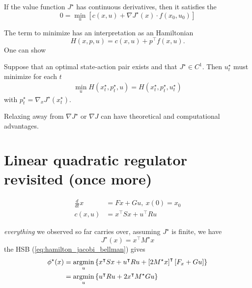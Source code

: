 \begin{theorem}\label{thm:1.23}
    If the value function \(J^\star\) has continuous derivatives, then it 
    satisfies the 
    \begin{equation}\label{eq:hamilton_jacobi_bellman}
        0=\min_{u}\left[c(x,u)+\nabla J^\star(x)\cdot f(x_0,u_0)\right]
    \end{equation}
\end{theorem}

The term to minimize  has an interpretation 
as an Hamiltonian 
\[H(x,p,u)=c(x,u)+p^\intercal f(x,u).\]
One can show 
\begin{theorem}\label{thm:1.24}
    Suppose that an optimal state-action pair exists 
    and that \(J^\star\in C^1\). Then \(u_t^\star\) must minimize
    for each \(t\) 
    \begin{align*}
        \min_u H(x_t^\star,p_t^\star,u)=H(x_t^\star,p_t^\star,u_t^\star)
    \end{align*}
    with \(p_t^\star=\nabla_x J^\star(x_t^\star)\).
\end{theorem}
\begin{remark}
    Relaxing away from \(\nabla J^\star\) or \(\nabla J\) can have 
    theoretical and computational advantages.
\end{remark}

\section{Linear quadratic regulator revisited (once more)}

\begin{align*}
    \frac{d}{dt}x&=Fx+Gu,\ x(0)=x_0\\
    c(x,u)&=x^\intercal S x + u^\intercal R u 
\end{align*}

\textit{everything} we observed so far carries over, assuming \(J^\star\) is finite, we 
have 
\[J^\star(x)=x^\intercal M^\star x\]
the HSB (\ref{eq:hamilton_jacobi_bellman}) gives 
\begin{align*}
    \phi^\star(x)&=\operatorname*{\text{argmin}}_u \left\{x^\intercal S x+ u^\intercal R u+ \left[2 M^\star x\right]^\intercal \left[F_x+ Gu\right] \right\}\\
    &=\operatorname*{\text{argmin}}_u \left\{u^\intercal R u+2 x^\intercal M^\star Gu \right\}
\end{align*}

